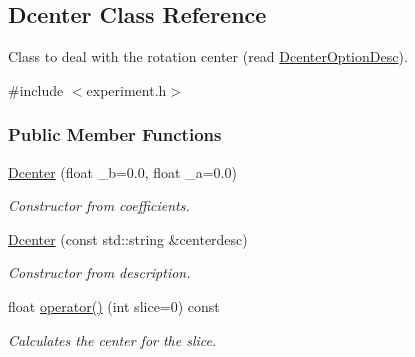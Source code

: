 \hypertarget{classDcenter}{
\subsection{Dcenter Class Reference}
\label{classDcenter}
}


Class to deal with the rotation center (read \hyperlink{group__experiment_gae4e896096ce7a0b4cbfbdd88b7e56286}{DcenterOptionDesc}).  




{\ttfamily \#include $<$experiment.h$>$}

\subsubsection*{Public Member Functions}
\begin{DoxyCompactItemize}
\item 
\hyperlink{classDcenter_a13fde113da369ac777c2cfb5fb826c20}{Dcenter} (float \_\-b=0.0, float \_\-a=0.0)
\begin{DoxyCompactList}\small\item\em Constructor from coefficients. \item\end{DoxyCompactList}\item 
\hyperlink{classDcenter_a81561f900f86770e3488fb2b58fd0c6f}{Dcenter} (const std::string \&centerdesc)
\begin{DoxyCompactList}\small\item\em Constructor from description. \item\end{DoxyCompactList}\item 
float \hyperlink{classDcenter_aa2e4b03994ad942955df1b2820b1c82f}{operator()} (int slice=0) const 
\begin{DoxyCompactList}\small\item\em Calculates the center for the slice. \item\end{DoxyCompactList}\end{DoxyCompactItemize}
